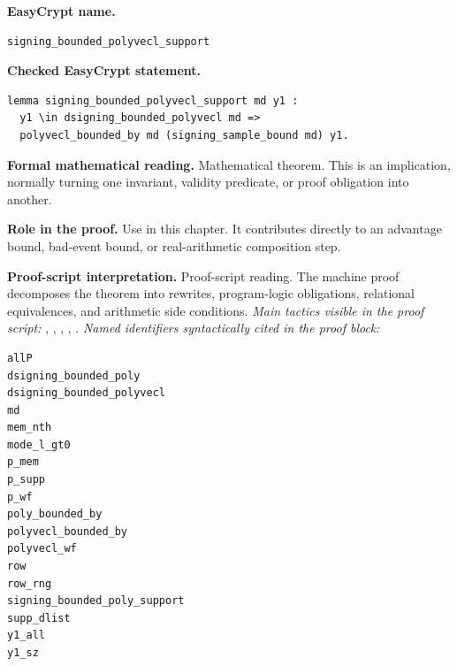 \begin{formaltheorem}
\noindent\textbf{EasyCrypt name.}
\begin{lstlisting}[language=EasyCrypt,basicstyle=\ttfamily\scriptsize]
signing_bounded_polyvecl_support
\end{lstlisting}
\noindent\textbf{Checked EasyCrypt statement.}
\begin{lstlisting}[language=EasyCrypt,basicstyle=\ttfamily\scriptsize]
lemma signing_bounded_polyvecl_support md y1 :
  y1 \in dsigning_bounded_polyvecl md =>
  polyvecl_bounded_by md (signing_sample_bound md) y1.
\end{lstlisting}
\noindent\textbf{Formal mathematical reading.}
Mathematical theorem. This is an implication, normally turning one invariant, validity predicate, or proof obligation into another.

\noindent\textbf{Role in the proof.}
Use in this chapter. It contributes directly to an advantage bound, bad-event bound, or real-arithmetic composition step.

\noindent\textbf{Proof-script interpretation.}
Proof-script reading. The machine proof decomposes the theorem into rewrites, program-logic obligations, relational equivalences, and arithmetic side conditions.
\emph{Main tactics visible in the proof script:} , , , , .
\emph{Named identifiers syntactically cited in the proof block:}
\begin{lstlisting}[language=EasyCrypt,basicstyle=\ttfamily\scriptsize]
allP
dsigning_bounded_poly
dsigning_bounded_polyvecl
md
mem_nth
mode_l_gt0
p_mem
p_supp
p_wf
poly_bounded_by
polyvecl_bounded_by
polyvecl_wf
row
row_rng
signing_bounded_poly_support
supp_dlist
y1_all
y1_sz
\end{lstlisting}

\end{formaltheorem}


